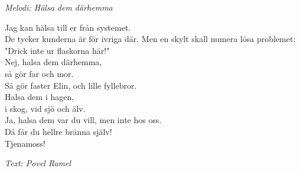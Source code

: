 {\footnotesize\textit{Melodi: Hälsa dem därhemma}}\par
\vspace{10pt}
Jag kan hälsa till er från systemet.\\
De tycker kunderna är för ivriga där.
Men en skylt skall numera lösa problemet:\\
"Drick inte ur flaskorna här!"\\
Nej, halsa dem därhemma,\\
så gör far och mor.\\
Så gör faster Elin, och lille fyllebror.\\
Halsa dem i hagen,\\
i skog, vid sjö och älv.\\
Ja, halsa dem var du vill, men inte hos oss.\\
Då får du hellre bränna själv!\\
Tjenamoss!\par
\vspace{10pt}
{\footnotesize\textit{Text: Povel Ramel}}
